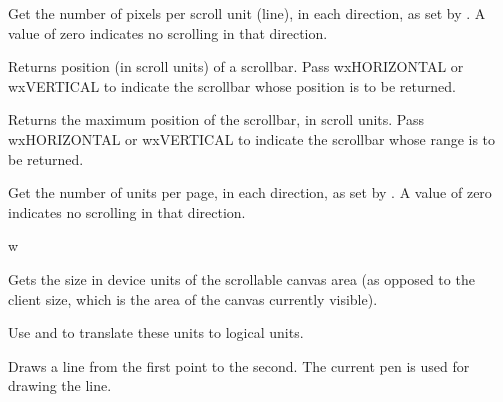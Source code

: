Get the number of pixels per scroll unit (line), in each direction, as set
by . A value of zero indicates no
scrolling in that direction.

\label{wxcanvasgetscrollpos}


Returns position (in scroll units) of a scrollbar. Pass wxHORIZONTAL or wxVERTICAL
to indicate the scrollbar whose position is to be returned.

\label{wxcanvasgetscrollrange}


Returns the maximum position of the scrollbar, in scroll units. Pass wxHORIZONTAL or wxVERTICAL
to indicate the scrollbar whose range is to be returned.

\label{wxcanvasgetscrollunits}


Get the number of units per page, in each direction, as set
by . A value of zero indicates no
scrolling in that direction.

\label{wxcanvasgetvirtualsize}w


Gets the size in device units of the scrollable canvas area (as
opposed to the client size, which is the area of the canvas currently
visible).

Use  and 
to translate these units to logical units.



Draws a line from the first point to the second. The current pen is
used for drawing the line.



